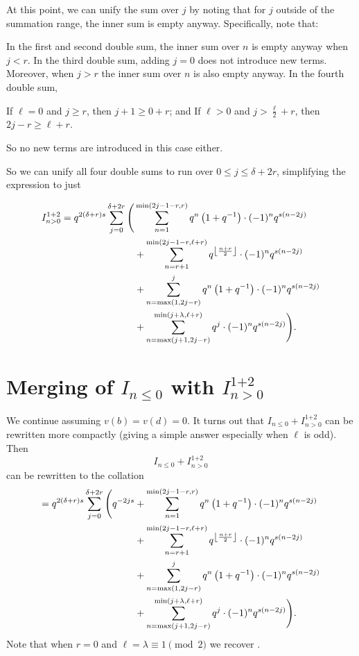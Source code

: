 At this point, we can unify the sum over $j$ by noting that for $j$ outside of the
summation range, the inner sum is empty anyway.
Specifically, note that:
\begin{itemize}
  \ii In the first and second double sum,
  the inner sum over $n$ is empty anyway when $j < r$.
  \ii In the third double sum, adding $j=0$ does not introduce new terms.
  Moreover, when $j > r$ the inner sum over $n$ is also empty anyway.
  \ii In the fourth double sum,
  \begin{itemize}
    \ii If $\ell = 0$ and $j \ge r$, then $j+1 \ge 0+r$; and
    \ii If $\ell > 0$ and $j > \frac{\ell}{2} + r$, then $2j-r \ge \ell+r$.
  \end{itemize}
  So no new terms are introduced in this case either.
\end{itemize}
So we can unify all four double sums to run over $0 \le j \le \delta + 2r$,
simplifying the expression to just

\begin{align*}
  I_{n > 0}^{\text{1+2}}
  = q^{2(\delta+r)s}
  \sum_{j = 0}^{\delta + 2r} \Bigg(
    & \sum_{n=1}^{\min(2j-1-r, r)}
      q^{n} \left( 1 + q^{-1} \right) \cdot (-1)^n q^{s(n-2j)} \\
    & + \sum_{n=r+1}^{\min(2j-1-r, \ell+r)}
      q^{\left\lfloor \frac{n+r}{2} \right\rfloor} \cdot (-1)^n q^{s(n-2j)} \\
    &+ \sum_{n=\max(1,2j-r)}^{j}
      q^{n} \left( 1 + q^{-1} \right) \cdot (-1)^n q^{s(n-2j)} \\
    &+ \sum_{n=\max(j+1, 2j-r)}^{\min(j+\lambda, \ell+r)} q^{j} \cdot (-1)^n q^{s(n-2j)} \Bigg).
\end{align*}

\section{Merging of $I_{n \le 0}$ with $I_{n > 0}^{\text{1+2}}$}
We continue assuming $v(b) = v(d) = 0$.
It turns out that $I_{n \le 0} + I_{n > 0}^{\text{1+2}}$ can be rewritten more compactly
(giving a simple answer especially when $\ell$ is odd).
Then
\[
  I_{n \le 0} + I_{n > 0}^{\text{1+2}}
\]
can be rewritten to the collation
\begin{align*}
  = q^{2(\delta+r)s}
  \sum_{j = 0}^{\delta + 2r} \Bigg(
    q^{-2js}
    &+ \sum_{n=1}^{\min(2j-1-r, r)}
      q^{n} \left( 1 + q^{-1} \right) \cdot (-1)^n q^{s(n-2j)} \\
    &+ \sum_{n=r+1}^{\min(2j-1-r, \ell+r)}
      q^{\left\lfloor \frac{n+r}{2} \right\rfloor} \cdot (-1)^n q^{s(n-2j)} \\
    &+ \sum_{n=\max(1,2j-r)}^{j}
      q^{n} \left( 1 + q^{-1} \right) \cdot (-1)^n q^{s(n-2j)} \\
    &+ \sum_{n=\max(j+1, 2j-r)}^{\min(j+\lambda, \ell+r)} q^{j} \cdot (-1)^n q^{s(n-2j)} \Bigg).
\end{align*}
Note that when $r=0$ and $\ell = \lambda \equiv 1 \pmod 2$
we recover \cite[Equation (4.13)]{ref:AFL}.

